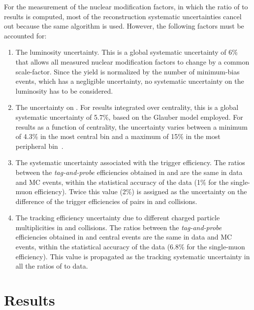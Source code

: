 For the measurement of the nuclear modification factors, in which the
ratio of \PbPb to \pp results is computed, most of the reconstruction
systematic uncertainties cancel out because the same algorithm is
used. However, the following factors must be accounted for:

\begin{enumerate}
\item The luminosity uncertainty. This is a global systematic
  uncertainty of 6\% that allows all measured nuclear modification
  factors to change by a common scale-factor. Since the \PbPb yield is
  normalized by the number of minimum-bias events, which has a
  negligible uncertainty, no systematic uncertainty on the \PbPb
  luminosity has to be considered.
\item The uncertainty on \taa. For results integrated over centrality,
  this is a global systematic uncertainty of 5.7\%, based on the
  Glauber model employed. For results as a function of centrality, the
  uncertainty varies between a minimum of 4.3\% in the most central
  bin and a maximum of 15\% in the most peripheral
  bin~\cite{Chatrchyan:2011sx}.
\item The systematic uncertainty associated with the trigger
  efficiency. The ratios between the \emph{tag-and-probe} efficiencies
  obtained in \pp and \PbPb are the same in data and MC events, within
  the statistical accuracy of the data (1\% for the single-muon
  efficiency).  Twice this value (2\%) is assigned as the uncertainty
  on the difference of the trigger efficiencies of \mumu pairs in
  \PbPb and \pp collisions.
\item The tracking efficiency uncertainty due to different charged
  particle multiplicities in \pp and \PbPb collisions.  The ratios
  between the \emph{tag-and-probe} efficiencies obtained in \pp and
  central \PbPb events are the same in data and MC events, within the
  statistical accuracy of the data (6.8\% for the single-muon
  efficiency).  This value is propagated as the tracking systematic
  uncertainty in all the ratios of \PbPb to \pp data.
\end{enumerate}

\section{Results}
\label{sec:results}

